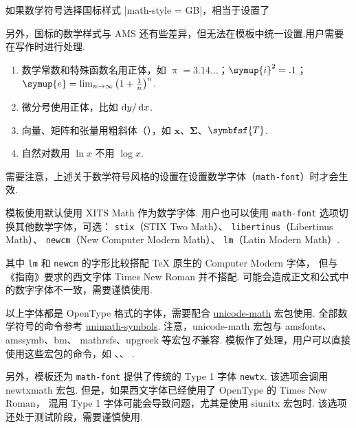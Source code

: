 \documentclass[a4paper]{ltxdoc}
\makeatletter
\DeclareRobustCommand\pkg{\textsf}
\DeclareRobustCommand\opt{\texttt}
\def\DescribeOption{\leavevmode\@bsphack\begingroup\MakePrivateLetters
  \Describe@Option}
\def\Describe@Option#1{\endgroup
              \marginpar{\raggedleft\PrintDescribeOption{#1}}%
              \SpecialEnvIndex{#1}\@esphack\ignorespaces}
\makeatother
\begin{document}
如果数学符号选择国标样式 |math-style = GB|，相当于设置了
\begin{latex}
\end{latex}

另外，国标的数学样式与 AMS 还有些差异，但无法在模板中统一设置.用户需要在写作时进行处理.
\begin{enumerate}
  \item 数学常数和特殊函数名用正体，如 $\uppi = 3.14\dots$；$\symup{i}^2 = .1$；
    $\symup{e} = \lim_{n \to \infty} \left( 1 + \frac{1}{n} \right)^n$.
  \item 微分号使用正体，比如 $\mathop{}\!\mathrm{d} y / \mathop{}\!\mathrm{d} x$.
  \item 向量、矩阵和张量用粗斜体（），如 $\symbf{x}$、$\symbf{\Sigma}$、$\symbfsf{T}$.
  \item 自然对数用 $\ln x$ 不用 $\log x$.
\end{enumerate}

需要注意，上述关于数学符号风格的设置在设置数学字体（\opt{math-font}）时才会生效.

\DescribeOption{math-font}
模板使用默认使用 XITS Math 作为数学字体.
用户也可以使用 \opt{math-font} 选项切换其他数学字体，可选：
\opt{stix}（STIX Two Math）、
\opt{libertinus}（Libertinus Math）、
\opt{newcm}（New Computer Modern Math）、
\opt{lm}（Latin Modern Math）.

其中 \opt{lm} 和 \opt{newcm} 的字形比较搭配 TeX 原生的 Computer Modern 字体，
但与《指南》要求的西文字体 Times New Roman 并不搭配.
可能会造成正文和公式中的数字字体不一致，需要谨慎使用.

以上字体都是 OpenType 格式的字体，需要配合
\href{http://mirrors.ctan.org/macros/latex/contrib/unicode-math/unicode-math.pdf}{\pkg{unicode-math}}
宏包使用.
全部数学符号的命令参考
\href{http://mirrors.ctan.org/macros/latex/contrib/unicode-math/unimath-symbols.pdf}{\pkg{unimath-symbols}}.
注意，\pkg{unicode-math} 宏包与 \pkg{amsfonts}、\pkg{amssymb}、\pkg{bm}、
\pkg{mathrsfs}、\pkg{upgreek} 等宏包\emph{不}兼容.
模板作了处理，用户可以直接使用这些宏包的命令，如 、、
.

另外，模板还为 \opt{math-font} 提供了传统的 Type 1 字体 \opt{newtx}.
该选项会调用 \pkg{newtxmath} 宏包.
但是，如果西文字体已经使用了 OpenType 的 Times New Roman，
混用 Type 1 字体可能会导致问题，尤其是使用 \pkg{siunitx} 宏包时.
该选项还处于测试阶段，需要谨慎使用.
\end{document}
